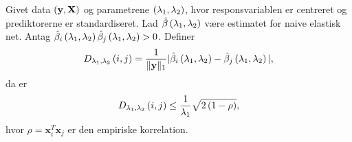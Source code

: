 \begin{thm} \label{thm:elastisk_net}
Givet data \(\del{\y, \X}\) og parametrene \(\del{\lambda_1, \lambda_2}\), hvor responsvariablen er centreret og prediktorerne er standardiseret.
Lad \(\hat{\beta} \del{\lambda_1, \lambda_2}\) være estimatet for naive elastisk net.
Antag \(\hat{\beta}_i \del{\lambda_1, \lambda_2} \hat{\beta}_j \del{\lambda_1, \lambda_2} > 0\).
Definer
\begin{align*}
D_{\lambda_1, \lambda_2} \del{i,j} = \frac{1}{\Vert \y \Vert_1} \vert \hat{\beta}_i \del{\lambda_1, \lambda_2} - \hat{\beta}_j \del{\lambda_1, \lambda_2} \vert,
\end{align*}
da er
\begin{align}
D_{\lambda_1, \lambda_2} \del{i,j} \leq \frac{1}{\lambda_1} \sqrt{2 \del{1-\rho}}, \label{eq:EN5}
\end{align}
hvor \(\rho = \mathbf{x}_i^T \mathbf{x}_j\) er den empiriske korrelation.
\end{thm}
